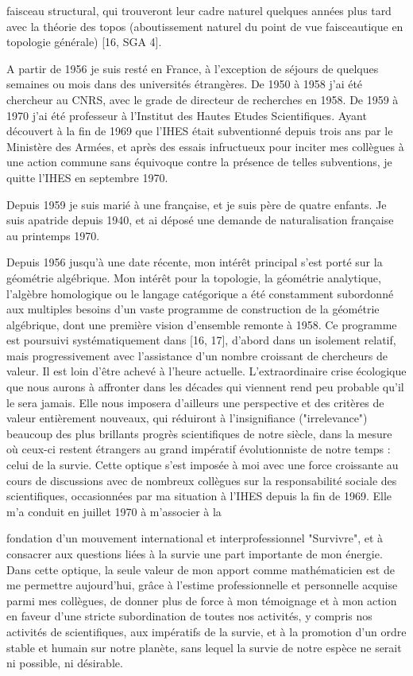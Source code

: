\documentclass[11pt,a4paper]{article}
\begin{document}
faisceau structural, qui trouveront leur cadre naturel quelques années plus tard avec la théorie des topos (aboutissement naturel du point de vue faisceautique en topologie générale) [16, SGA 4].

A partir de 1956 je suis resté en France, à l'exception de séjours de quelques semaines ou mois dans des universités étrangères. De 1950 à 1958 j'ai été chercheur au CNRS, avec le grade de directeur de recherches en 1958. De 1959 à 1970 j'ai été professeur à l'Institut des Hautes Etudes Scientifiques. Ayant découvert à la fin de 1969 que l'IHES était subventionné depuis trois ans par le Ministère des Armées, et après des essais infructueux pour inciter mes collègues à une action commune sans équivoque contre la présence de telles subventions, je quitte l'IHES en septembre 1970.

Depuis 1959 je suis marié à une française, et je suis père de quatre enfants. Je suis apatride depuis 1940, et ai déposé une demande de naturalisation française au printemps 1970.

Depuis 1956 jusqu'à une date récente, mon intérêt principal s'est porté sur la géométrie algébrique. Mon intérêt pour la topologie, la géométrie analytique, l'algèbre homologique ou le langage catégorique a été constamment subordonné aux multiples besoins d'un vaste programme de construction de la géométrie algébrique, dont une première vision d'ensemble remonte à 1958. Ce programme est poursuivi systématiquement dans [16, 17], d'abord dans un isolement relatif, mais progressivement avec l'assistance d'un nombre croissant de chercheurs de valeur. Il est loin d'être achevé à l'heure actuelle. L'extraordinaire crise écologique que nous aurons à affronter dans les décades qui viennent rend peu probable qu'il le sera jamais. Elle nous imposera d'ailleurs une perspective et des critères de valeur entièrement nouveaux, qui réduiront à l'insignifiance ("irrelevance") beaucoup des plus brillants progrès scientifiques de notre siècle, dans la mesure où ceux-ci restent étrangers au grand impératif évolutionniste de notre temps : celui de la survie. Cette optique s'est imposée à moi avec une force croissante au cours de discussions avec de nombreux collègues sur la responsabilité sociale des scientifiques, occasionnées par ma situation à l'IHES depuis la fin de 1969. Elle m'a conduit en juillet 1970 à m'associer à la

fondation d'un mouvement international et interprofessionnel "Survivre", et à consacrer aux questions liées à la survie une part importante de mon énergie. Dans cette optique, la seule valeur de mon apport comme mathématicien est de me permettre aujourd'hui, grâce à l'estime professionnelle et personnelle acquise parmi mes collègues, de donner plus de force à mon témoignage et à mon action en faveur d'une stricte subordination de toutes nos activités, y compris nos activités de scientifiques, aux impératifs de la survie, et à la promotion d'un ordre stable et humain sur notre planète, sans lequel la survie de notre espèce ne serait ni possible, ni désirable.
\end{document}
